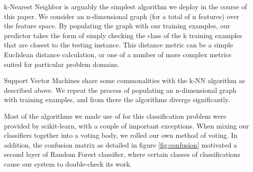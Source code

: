 k-Nearest Neighbor\cite{nearest} is arguably the simplest algorithm we 
deploy in the course of this paper.  We consider an n-dimensional 
graph (for a total of n features) over the feature space.  By populating 
the graph with our training examples, our predictor takes the form of 
simply checking the class of the k training examples that are closest 
to the testing instance.  This distance metric can be a simple 
Euclidean distance calculation, or one of a number of more complex 
metrics suited for particular problem domains.

Support Vector Machines\cite{support} share some commonalities with 
the k-NN algorithm as described above.  We repeat the process of 
populating an n-dimensional graph with training examples, and from 
there the algorithms diverge significantly.  


Most of the algorithms we made use of for this classification problem 
were provided by scikit-learn, with a couple of important exceptions.  
When mixing our classifiers together into a voting body, we rolled our 
own method of voting.  In addition, the confusion matrix as detailed in 
figure \ref{fig:confusion} motivated a second layer of Random Forest 
classifier, where certain classes of classifications cause our system to 
double-check its work.  


